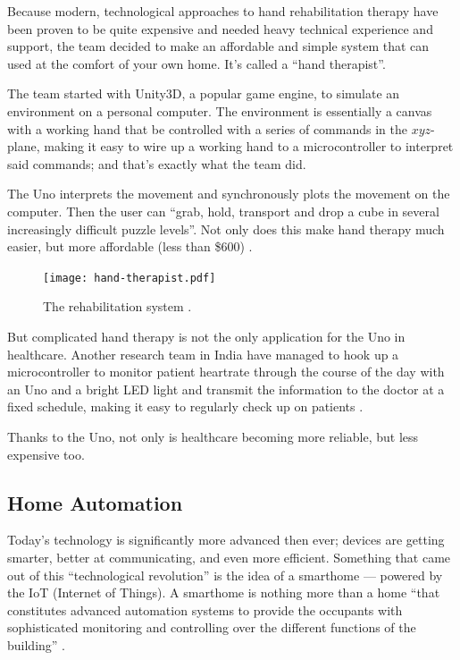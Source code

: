 \documentclass[11pt,letterpaper,twocolumn]{article}
\begin{document}
Because modern, technological approaches to hand rehabilitation therapy have been proven to be quite expensive and needed heavy technical experience and support, the team decided to make an affordable and simple system that can used at the comfort of your own home. It's called a ``hand therapist''.

The team started with Unity3D, a popular game engine, to simulate an environment on a personal computer. The environment is essentially a canvas with a working hand that be controlled with a series of commands in the $xyz$-plane, making it easy to wire up a working hand to a microcontroller to interpret said commands; and that's exactly what the team did.

The Uno interprets the movement and synchronously plots the movement on the computer. Then the user can ``grab, hold, transport and drop a cube in several increasingly difficult puzzle levels''. Not only does this make hand therapy much easier, but more affordable (less than \$\num{600}) \cite{hand}.

\begin{figure}[!ht]
    \centering
    \texttt{[image: hand-therapist.pdf]}
    \caption{The rehabilitation system \cite{hand}.}
\end{figure}

But complicated hand therapy is not the only application for the Uno in healthcare. Another research team in India have managed to hook up a microcontroller to monitor patient heartrate through the course of the day with an Uno and a bright LED light and transmit the information to the doctor at a fixed schedule, making it easy to regularly check up on patients \cite{heartrate}.

Thanks to the Uno, not only is healthcare becoming more reliable, but less expensive too.

\subsection{Home Automation}
Today's technology is significantly more advanced then ever; devices are getting smarter, better at communicating, and even more efficient. Something that came out of this ``technological revolution'' is the idea of a smarthome --- powered by the IoT (Internet of Things). A smarthome is nothing more than a home ``that constitutes advanced automation systems to provide the occupants with sophisticated monitoring and controlling over the different functions of the building'' \cite{iot}.
\end{document}
